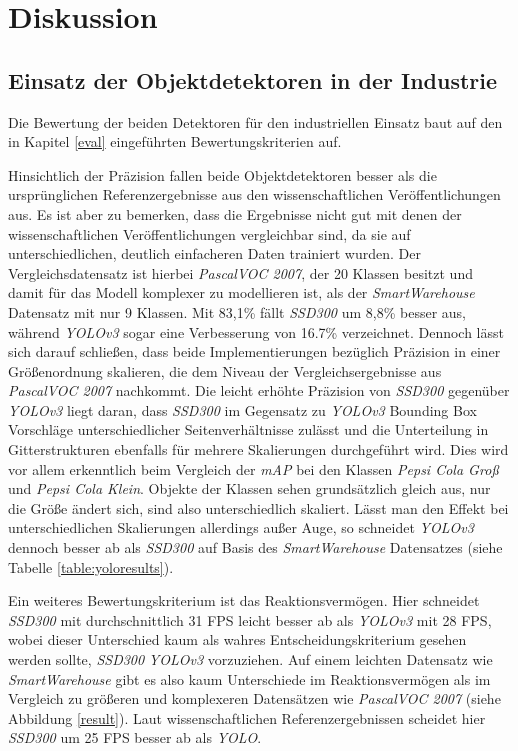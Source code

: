 \chapter{Diskussion}

\section{Einsatz der Objektdetektoren in der Industrie}

Die Bewertung der beiden Detektoren für den industriellen Einsatz baut auf den in Kapitel \ref{eval} eingeführten Bewertungskriterien auf. 

Hinsichtlich der Präzision fallen beide Objektdetektoren besser als die ursprünglichen Referenzergebnisse aus den wissenschaftlichen Veröffentlichungen aus. Es ist aber zu bemerken, dass die Ergebnisse nicht gut mit denen der wissenschaftlichen Veröffentlichungen vergleichbar sind, da sie auf unterschiedlichen, deutlich einfacheren Daten trainiert wurden. Der Vergleichsdatensatz ist hierbei \textit{PascalVOC 2007}, der 20 Klassen besitzt und damit für das Modell komplexer zu modellieren ist, als der \textit{SmartWarehouse} Datensatz mit nur 9 Klassen. Mit 83,1\% fällt \textit{SSD300} um 8,8\% besser aus, während \textit{YOLOv3} sogar eine Verbesserung von 16.7\% verzeichnet. Dennoch lässt sich darauf schließen, dass beide Implementierungen bezüglich Präzision in einer Größenordnung skalieren, die dem Niveau der Vergleichsergebnisse aus \textit{PascalVOC 2007} nachkommt. Die leicht erhöhte Präzision von \textit{SSD300} gegenüber \textit{YOLOv3} liegt daran, dass \textit{SSD300} im Gegensatz zu \textit{YOLOv3} Bounding Box Vorschläge unterschiedlicher Seitenverhältnisse zulässt und die Unterteilung in Gitterstrukturen ebenfalls für mehrere Skalierungen durchgeführt wird. Dies wird vor allem erkenntlich beim Vergleich der \textit{mAP} bei den Klassen \textit{Pepsi Cola Groß} und \textit{Pepsi Cola Klein}. Objekte der Klassen sehen grundsätzlich gleich aus, nur die Größe ändert sich, sind also unterschiedlich skaliert. Lässt man den Effekt bei unterschiedlichen Skalierungen allerdings außer Auge, so schneidet \textit{YOLOv3} dennoch besser ab als \textit{SSD300} auf Basis des \textit{SmartWarehouse} Datensatzes (siehe Tabelle \ref{table:yoloresults}).

Ein weiteres Bewertungskriterium ist das Reaktionsvermögen. Hier schneidet \textit{SSD300} mit durchschnittlich 31 FPS leicht besser ab als \textit{YOLOv3} mit 28 FPS, wobei dieser Unterschied kaum als wahres Entscheidungskriterium gesehen werden sollte, \textit{SSD300} \textit{YOLOv3} vorzuziehen. Auf einem leichten Datensatz wie \textit{SmartWarehouse} gibt es also kaum Unterschiede im Reaktionsvermögen als im Vergleich zu größeren und komplexeren Datensätzen wie \textit{PascalVOC 2007} (siehe Abbildung \ref{result}). Laut wissenschaftlichen Referenzergebnissen scheidet hier \textit{SSD300} um 25 FPS besser ab als \textit{YOLO}.


